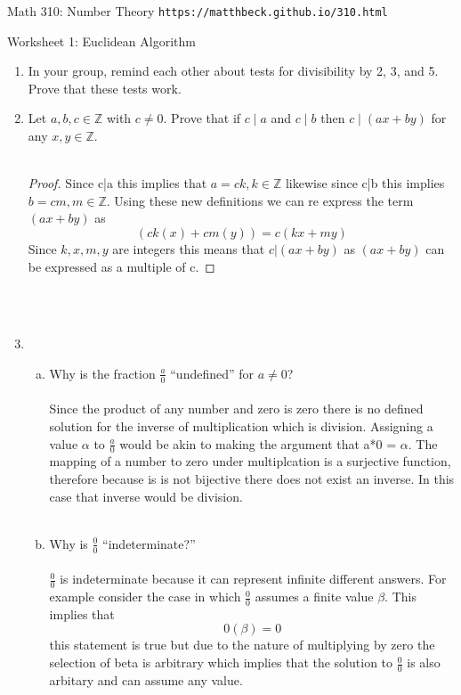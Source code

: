 \documentclass[11pt]{article}
\def\Z{\mathbb{Z}}
\begin{document}
\setlength{\parindent}{0pt}
\setlength{\parskip}{0.2cm}

$\mbox{}$
\vspace{-1in}

{ Math 310: Number Theory}
\hfill
{\tt https://matthbeck.github.io/310.html}

\vspace{.3in}




\begin{center}
\Large{Worksheet 1: Euclidean Algorithm}
\end{center}

\begin{enumerate}

\item In your group, remind each other about tests for divisibility by 2, 3, and 5.
Prove that these tests work.

\item Let $a, b, c \in \Z$ with $c \ne 0$.
Prove that if $c \mid a$ and $c \mid b$ then $c \mid (ax+by)$ for any $x, y \in \Z$.\\\\
\begin{proof}
  Since c|a this implies that $a=ck,k \in \mathbb{Z}$ likewise since c|b this implies $b=cm, m\in \mathbb{Z}$. Using these new definitions we can re express the term $(ax+by)$ as \[
    (ck(x)+cm(y))=c(kx+my)
  \]
  Since $k,x,m,y$ are integers this means that $c|(ax+by)$ as $(ax+by)$ can be expressed as a multiple of c.
\end{proof}
\\\\
\item
\begin{enumerate}[(a)]
  \item Why is the fraction $\frac{a}{0}$ ``undefined'' for $a \ne 0$?\\\\
  Since the product of any number and zero is zero there is no defined solution for the inverse of multiplication which is division. Assigning a value $\alpha$ to $\frac{a}{0}$ would be akin to making the argument that a*0 = $\alpha$. The mapping of a number to zero under multiplcation is a surjective function, therefore because is is not bijective there does not exist an inverse. In this case that inverse would be division. \\\\
  \item Why is $\frac{0}{0}$ ``indeterminate?''
  \\\\
  $\frac{0}{0}$ is indeterminate because it can represent infinite different answers. For example consider the case in which   $\frac{0}{0}$ assumes a finite value $\beta$. This implies that \[
    0(\beta)=0
  \]
  this statement is true but due to the nature of multiplying by zero the selection of beta is arbitrary which implies that the solution to $\frac{0}{0}$ is also arbitary and can assume any value.
  \\\\
\end{enumerate}


\end{enumerate}
\end{document}
